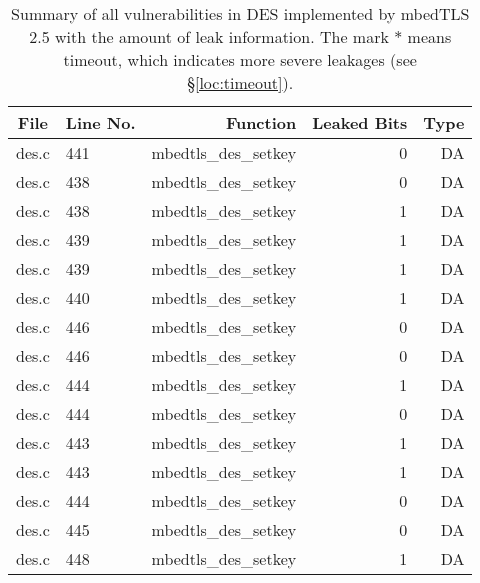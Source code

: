 \begin{table}%
\centering\tiny\scriptsize
\caption{Summary of all vulnerabilities in DES implemented by mbedTLS 2.5 with the amount of leak information. The mark $*$ means timeout, which indicates more severe leakages (see \S\ref{loc:timeout}).}\label{tab:DESmbedTLS}
\begin{tabular}{clrrr}
\hline
\textbf{File} & \textbf{Line No.} & \textbf{Function} & \textbf{Leaked Bits} & \textbf{Type} \\\hline
des.c& 441&mbedtls\_des\_setkey&0 &DA\\
des.c& 438&mbedtls\_des\_setkey&0 &DA\\
des.c& 438&mbedtls\_des\_setkey&1 &DA\\
des.c& 439&mbedtls\_des\_setkey&1 &DA\\
des.c& 439&mbedtls\_des\_setkey&1 &DA\\
des.c& 440&mbedtls\_des\_setkey&1 &DA\\
des.c& 446&mbedtls\_des\_setkey&0 &DA\\
des.c& 446&mbedtls\_des\_setkey&0 &DA\\
des.c& 444&mbedtls\_des\_setkey&1 &DA\\
des.c& 444&mbedtls\_des\_setkey&0 &DA\\
des.c& 443&mbedtls\_des\_setkey&1 &DA\\
des.c& 443&mbedtls\_des\_setkey&1 &DA\\
des.c& 444&mbedtls\_des\_setkey&0 &DA\\
des.c& 445&mbedtls\_des\_setkey&0 &DA\\
des.c& 448&mbedtls\_des\_setkey&1 &DA\\
\hline
\end{tabular}
\end{table}